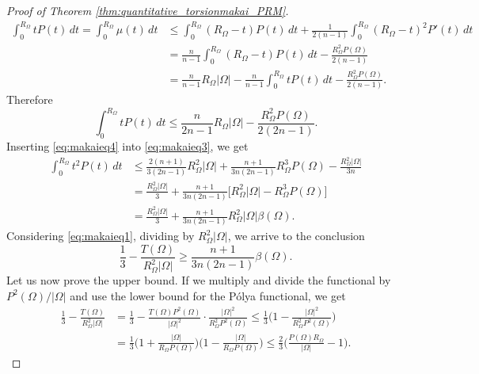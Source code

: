\documentclass[oneside,a4paper,11pt,notitlepage]{article}
\newcommand{\abs}[1]{{\left|#1\right|}}
\theoremstyle{definition}
\theoremstyle{plain}
\theoremstyle{definition}
\begin{document}
\begin{proof}[Proof of Theorem \ref{thm:quantitative_torsionmakai_PRM}]
    \begin{equation*}
    \begin{split}
\int_{0}^{R_\Omega}tP(t)\,dt= \int_{0}^{R_\Omega}\mu(t)\,dt&\le \int_{0}^{R_\Omega}(R_\Omega-t)P(t)\,dt+ \frac{1}{2(n-1)}\int_{0}^{R_\Omega}(R_\Omega-t)^2P'(t)\,dt\\
&=\frac{n}{n-1}\int_{0}^{R_\Omega}(R_\Omega-t)P(t)\,dt-\frac{R_\Omega^2P(\Omega)}{2(n-1)}\\
&=\frac{n}{n-1}R_\Omega\abs{\Omega}-\frac{n}{n-1}\int_{0}^{R_\Omega}tP(t)\,dt-\frac{R_\Omega^2P(\Omega)}{2(n-1)}.
\end{split}
    \end{equation*}
    Therefore
    \begin{equation}\label{eq:makaieq4}
        \int_{0}^{R_\Omega}tP(t)\,dt\le \frac{n}{2n-1}R_\Omega\abs{\Omega}-\frac{R_\Omega^2P(\Omega)}{2(2n-1)}.
    \end{equation}
    Inserting \eqref{eq:makaieq4} into \eqref{eq:makaieq3}, we get
    \begin{equation*}
       \begin{split}
       \int_0^{R_\Omega}t^2P(t)\,dt&\le \frac{2(n+1)}{3(2n-1)}R_\Omega^2\abs{\Omega}+\frac{n+1}{3n(2n-1)} R_\Omega^3P(\Omega)-\frac{R_\Omega^2\abs{\Omega}}{3n}\\
       &=\frac{R_\Omega^2\abs{\Omega}}{3}+\frac{n+1}{3n(2n-1)}\bigg[R_\Omega^2\abs{\Omega}-R_\Omega^3P(\Omega)\bigg]\\
       &=\frac{R_\Omega^2\abs{\Omega}}{3}+\frac{n+1}{3n(2n-1)}R_\Omega^2\abs{\Omega}\beta(\Omega).
\end{split}
\end{equation*}
    Considering \eqref{eq:makaieq1}, dividing by $R^2_\Omega\abs{\Omega}$, we arrive to the conclusion
    \begin{equation*}
        \frac{1}{3}-\frac{T(\Omega)}{R^2_\Omega\abs{\Omega}}\ge \frac{n+1}{3n(2n-1)}\beta(\Omega).
    \end{equation*}
    Let us now prove the upper bound. If we multiply and divide the functional by $P^2(\Omega)/\abs{\Omega}$ and use the lower bound for the P\'olya functional, we get
\begin{equation*}
\begin{split}
\frac{1}{3}-\frac{T(\Omega)}{R_\Omega^2 \abs{\Omega}}&= \frac{1}{3}-\frac{T(\Omega)P^2(\Omega)}{ \abs{\Omega}^2}\cdot\frac{\abs{\Omega}^2}{R_\Omega^2 P^2(\Omega)}\le \frac{1}{3}\bigg(1-\frac{\abs{\Omega}^2}{R_\Omega^2 P^2(\Omega)}\bigg)\\
    &= \frac{1}{3}\bigg(1+\frac{\abs{\Omega}}{R_\Omega P(\Omega)}\bigg)\bigg(1-\frac{\abs{\Omega}}{R_\Omega P(\Omega)}\bigg)\le \frac{2}{3}\bigg(\frac{P(\Omega)R_\Omega}{\abs{\Omega}}-1\bigg).
        \end{split}
\end{equation*}
    \end{proof}
\end{document}
